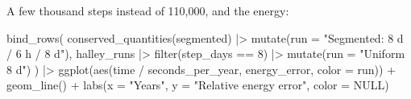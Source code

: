 \documentclass[
  10.5pt,
  letterpaper,
]{scrbook}
\newenvironment{Shaded}{\begin{snugshade}}{\end{snugshade}}
\newcommand{\AttributeTok}[1]{\textcolor[rgb]{0.00,0.00,0.00}{#1}}
\newcommand{\CommentTok}[1]{\textcolor[rgb]{0.00,0.00,0.00}{\textit{#1}}}
\newcommand{\ConstantTok}[1]{\textcolor[rgb]{0.00,0.00,0.00}{#1}}
\newcommand{\DecValTok}[1]{\textcolor[rgb]{0.00,0.00,0.00}{#1}}
\newcommand{\FunctionTok}[1]{\textcolor[rgb]{0.00,0.00,0.00}{#1}}
\newcommand{\NormalTok}[1]{\textcolor[rgb]{0.00,0.00,0.00}{#1}}
\newcommand{\OtherTok}[1]{\textcolor[rgb]{0.00,0.00,0.00}{#1}}
\newcommand{\SpecialCharTok}[1]{\textcolor[rgb]{0.00,0.00,0.00}{#1}}
\newcommand{\StringTok}[1]{\textcolor[rgb]{0.00,0.00,0.00}{#1}}
\theoremstyle{definition}
\theoremstyle{plain}
\theoremstyle{remark}
\begin{document}
\begin{Shaded}
\end{Shaded}

A few thousand steps instead of 110,000, and the energy:

\begin{Shaded}
\begin{Highlighting}[]
\FunctionTok{bind\_rows}\NormalTok{(}
  \FunctionTok{conserved\_quantities}\NormalTok{(segmented) }\SpecialCharTok{|\textgreater{}} \FunctionTok{mutate}\NormalTok{(}\AttributeTok{run =} \StringTok{"Segmented: 8 d / 6 h / 8 d"}\NormalTok{),}
\NormalTok{  halley\_runs }\SpecialCharTok{|\textgreater{}} \FunctionTok{filter}\NormalTok{(step\_days }\SpecialCharTok{==} \DecValTok{8}\NormalTok{) }\SpecialCharTok{|\textgreater{}} \FunctionTok{mutate}\NormalTok{(}\AttributeTok{run =} \StringTok{"Uniform 8 d"}\NormalTok{)}
\NormalTok{) }\SpecialCharTok{|\textgreater{}}
  \FunctionTok{ggplot}\NormalTok{(}\FunctionTok{aes}\NormalTok{(time }\SpecialCharTok{/}\NormalTok{ seconds\_per\_year, energy\_error, }\AttributeTok{color =}\NormalTok{ run)) }\SpecialCharTok{+}
  \FunctionTok{geom\_line}\NormalTok{() }\SpecialCharTok{+}
  \FunctionTok{labs}\NormalTok{(}\AttributeTok{x =} \StringTok{"Years"}\NormalTok{, }\AttributeTok{y =} \StringTok{"Relative energy error"}\NormalTok{, }\AttributeTok{color =} \ConstantTok{NULL}\NormalTok{)}
\end{Highlighting}
\end{Shaded}
\end{document}
